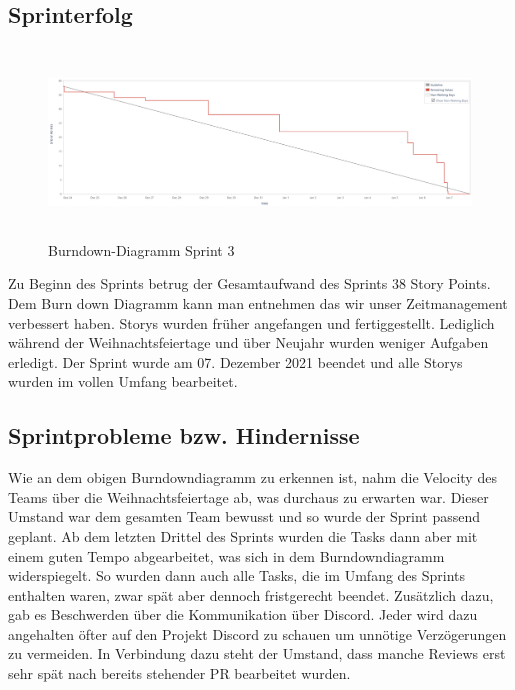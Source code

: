\documentclass[12pt,a4paper, oneside]{article}
\begin{document}
    \subsection{Sprinterfolg}
    \begin{figure}[h]
        \centering
        \includegraphics[width=\textwidth, height=5cm]{../img/sprint_03/Burndown-Sprint3.PNG}
        \caption{Burndown-Diagramm Sprint 3}
        \label{fig: Burndown-Sprint3}
    \end{figure}

    \noindent
    Zu Beginn des Sprints betrug der Gesamtaufwand des Sprints 38 Story Points.
    Dem Burn down Diagramm kann man entnehmen das wir unser Zeitmanagement verbessert haben.
    Storys wurden früher angefangen und fertiggestellt.
    Lediglich während der Weihnachtsfeiertage und über Neujahr wurden weniger Aufgaben erledigt.
    Der Sprint wurde am 07. Dezember 2021 beendet und alle Storys wurden im vollen Umfang bearbeitet.



    \subsection{Sprintprobleme bzw. Hindernisse}

    Wie an dem obigen Burndowndiagramm zu erkennen ist, nahm die Velocity des Teams über die Weihnachtsfeiertage ab, was durchaus zu erwarten war. Dieser Umstand war dem gesamten Team bewusst und so wurde der Sprint passend geplant. Ab dem letzten Drittel des Sprints wurden die Tasks dann aber mit einem guten Tempo abgearbeitet, was sich in dem Burndowndiagramm widerspiegelt. So wurden dann auch alle Tasks, die im Umfang des Sprints enthalten waren, zwar spät aber dennoch fristgerecht beendet. Zusätzlich dazu, gab es Beschwerden über die Kommunikation über Discord. Jeder wird dazu angehalten öfter auf den Projekt Discord zu schauen um unnötige Verzögerungen zu vermeiden. In Verbindung dazu steht der Umstand, dass manche Reviews erst sehr spät nach bereits stehender PR bearbeitet wurden.
\end{document}
